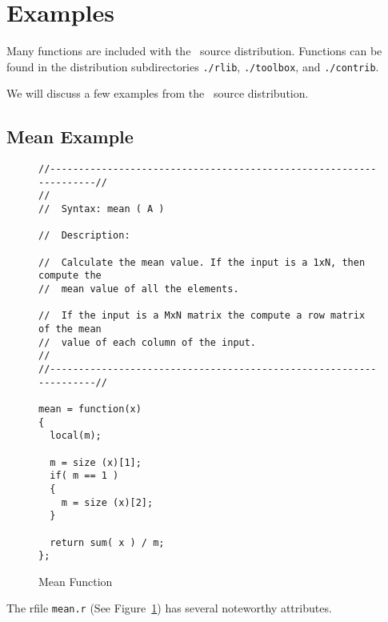 \section{Examples}

   Many functions are included with the \RLaB\ source distribution.
   Functions can be found in the distribution subdirectories
   \verb+./rlib+, \verb+./toolbox+, and \verb+./contrib+.

   We will discuss a few examples from the \RLaB\ source distribution.
   
\subsection{Mean Example}

\begin{figure}
\begin{verbatim}
//-------------------------------------------------------------------//
//
//  Syntax:	mean ( A )

//  Description:

//  Calculate the mean value. If the input is a 1xN, then compute the
//  mean value of all the elements. 

//  If the input is a MxN matrix the compute a row matrix of the mean
//  value of each column of the input. 
//
//-------------------------------------------------------------------//

mean = function(x)
{
  local(m);

  m = size (x)[1];
  if( m == 1 ) 
  { 
    m = size (x)[2];
  }

  return sum( x ) / m;
};
\end{verbatim}
\caption{Mean Function} \label{fig:mean}
\end{figure}

   The rfile \verb+mean.r+ (See Figure~\ref{fig:mean}) has several
   noteworthy attributes.

